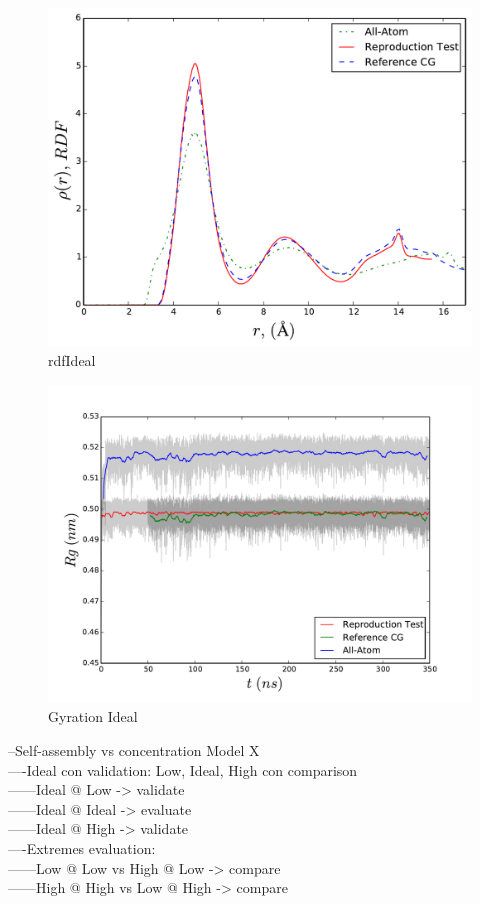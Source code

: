\documentclass[10pt,a4paper,twoside]{article}
\begin{document}
     \begin{figure}
  \begin{center}
	\includegraphics[width=0.8 \textwidth]{./graphs/rdfI}
	\caption{rdfIdeal}
	\label{gfx:rdfI}
	\end{center}
	\end{figure}
	     \begin{figure}
  \begin{center}
		\includegraphics[width=0.8 \textwidth]{./graphs/GyraI}
	\caption{Gyration Ideal}
	\label{gfx:gyrI}
	\end{center}
	\end{figure}
	
 --Self-assembly vs concentration Model X\\
  ----Ideal con validation: Low, Ideal, High con comparison\\
   ------Ideal @ Low -> validate\\
   ------Ideal @ Ideal -> evaluate\\
   ------Ideal @ High -> validate\\
  ----Extremes evaluation:\\
  ------Low @ Low vs High @ Low -> compare\\
   ------High @ High vs Low @ High -> compare\\
\end{document}
